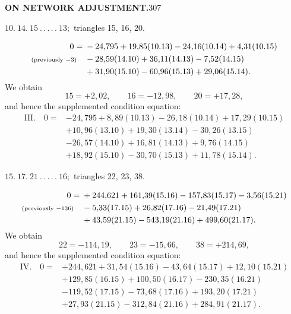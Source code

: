 \newpage
\noindent\textbf{ON NETWORK ADJUSTMENT.}\hfill307
\begin{center}
$10.\ 14.\ 15\ .\,.\,.\,.\,.\ 13;$ triangles 15, 16, 20.
\end{center}
\[
\begin{aligned}
0={}&-24{,}795+19{,}85(10.13)-24{,}16(10.14)+4{,}31(10.15)\\
\text{\scriptsize(previously $-3$)}\quad&-28{,}59(14.10)+36{,}11(14.13)-7{,}52(14.15)\\
&+31{,}90(15.10)-60{,}96(15.13)+29{,}06(15.14).
\end{aligned}
\]
We obtain
\[
15=+2{,}02,\qquad16=-12{,}98,\qquad20=+17{,}28,
\]
and hence the supplemented condition equation:
\[
\begin{aligned}
\mathrm{III.}\quad0={}&-24{,}795+8{,}89(10.13)-26{,}18(10.14)+17{,}29(10.15)\\
&+10{,}96(13.10)+19{,}30(13.14)-30{,}26(13.15)\\
&-26{,}57(14.10)+16{,}81(14.13)+9{,}76(14.15)\\
&+18{,}92(15.10)-30{,}70(15.13)+11{,}78(15.14).
\end{aligned}
\]

\par\bigskip
\begin{center}
$15.\ 17.\ 21\ .\,.\,.\,.\,.\ 16;$ triangles 22, 23, 38.
\end{center}
\[
\begin{aligned}
0={}&+244{,}621+161{,}39(15.16)-157{,}83(15.17)-3{,}56(15.21)\\
\text{\scriptsize(previously $-136$)}\quad&-5{,}33(17.15)+26{,}82(17.16)-21{,}49(17.21)\\
&+43{,}59(21.15)-543{,}19(21.16)+499{,}60(21.17).
\end{aligned}
\]
We obtain
\[
22=-114{,}19,\qquad23=-15{,}66,\qquad38=+214{,}69,
\]
and hence the supplemented condition equation:
\[
\begin{aligned}
\mathrm{IV.}\quad0={}&+244{,}621+31{,}54(15.16)-43{,}64(15.17)+12{,}10(15.21)\\
&+129{,}85(16.15)+100{,}50(16.17)-230{,}35(16.21)\\
&-119{,}52(17.15)-73{,}68(17.16)+193{,}20(17.21)\\
&+27{,}93(21.15)-312{,}84(21.16)+284{,}91(21.17).
\end{aligned}
\]

